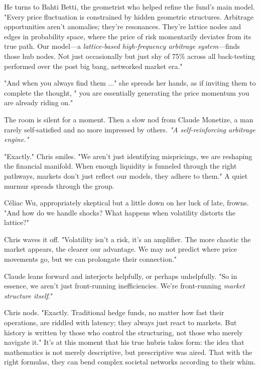 \smallskip

He turns to Bahti Betti, the geometrist who helped refine the fund's main model. "Every price fluctuation is constrained by hidden geometric structures. Arbitrage opportunities aren’t anomalies; they’re resonances. They’re lattice nodes and edges in probability space, where the price of risk momentarily deviates from its true path. Our model—a \textit{lattice-based high-frequency arbitrage system}—finds those hub nodes. Not just occasionally but just shy of 75\% across all back-testing performed over the post big bang, networked market era."

\smallskip

"And when you always find them ..." she spreads her hands, as if inviting them to complete the thought, " you are essentially generating the price momentum you are already riding on."

\smallskip

The room is silent for a moment. Then a slow nod from Claude Monetize, a man rarely self-satisfied and no more impressed by others. \textit{"A self-reinforcing arbitrage engine."}

\smallskip

"Exactly." Chris smiles. "We aren’t just identifying mispricings, we are reshaping the financial manifold. When enough liquidity is funneled through the right pathways, markets don’t just reflect our models, they adhere to them." A quiet murmur spreads through the group.

\smallskip

Céliac Wu, appropriately skeptical but a little down on her luck of late, frowns. "And how do we handle shocks? What happens when volatility distorts the lattice?"

Chris waves it off. "Volatility isn’t a risk, it’s an amplifier. The more chaotic the market appears, the clearer our advantage. We may not predict where price movements go, but we can prolongate their connection."

\smallskip

Claude leans forward and interjects helpfully, or perhaps unhelpfully. "So in essence, we aren’t just front-running inefficiencies. We’re front-running \textit{market structure itself}."

\smallskip

Chris nods. "Exactly. Traditional hedge funds, no matter how fast their operations, are riddled with latency; they always just react to markets. But history is written by those who control the structuring, not those who merely navigate it." It’s at this moment that his true hubris takes form: the idea that mathematics is not merely descriptive, but prescriptive was aired. That with the right formulas, they can bend complex societal networks according to their whim. 


